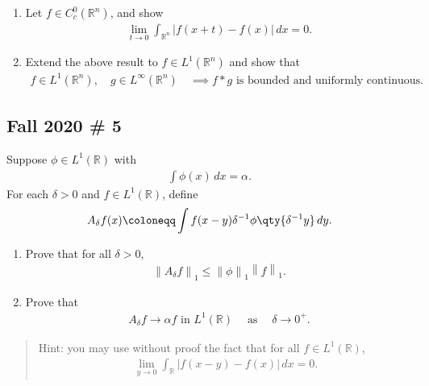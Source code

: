 \begin{enumerate}
\def\labelenumi{\arabic{enumi}.}
\item
  Let \(f \in C_c^0({\mathbb{R}}^n)\), and show
  \begin{align*}
  \lim _{t \to 0} \int_{{\mathbb{R}}^n} |f(x+t) - f(x)| \, dx = 0
  .\end{align*}
\item
  Extend the above result to \(f\in L^1({\mathbb{R}}^n)\) and show that
  \begin{align*}
  f\in L^1({\mathbb{R}}^n), \quad g\in L^\infty({\mathbb{R}}^n) \quad
  \implies f \ast g \text{ is bounded and uniformly continuous. }
  \end{align*}
\end{enumerate}

\hypertarget{fall-2020-5}{%
\subsection{Fall 2020 \# 5}\label{fall-2020-5}}

Suppose \(\phi\in L^1({\mathbb{R}})\) with
\begin{align*}  
\int \phi(x) \, dx = \alpha
.\end{align*}
For each \(\delta > 0\) and \(f\in L^1({\mathbb{R}})\), define
\begin{align*}  
A_\delta f(x) \coloneqq\int f(x-y) \delta^{-1} \phi\qty{\delta^{-1} y}\, dy
.\end{align*}

\begin{enumerate}
\def\labelenumi{\alph{enumi}.}
\item
  Prove that for all \(\delta > 0\),
  \begin{align*}  
  {\left\lVert {A_\delta f} \right\rVert}_1 \leq {\left\lVert {\phi} \right\rVert}_1 {\left\lVert {f} \right\rVert}_1
  .\end{align*}
\item
  Prove that
  \begin{align*}  
  A_\delta f \to \alpha f \text{ in } L^1({\mathbb{R}}) {\quad \operatorname{as} \quad} \delta\to 0^+
  .\end{align*}
\end{enumerate}

\begin{quote}
Hint: you may use without proof the fact that for all
\(f\in L^1({\mathbb{R}})\),
\begin{align*}  
\lim_{y\to 0} \int_{\mathbb{R}}{\left\lvert {f(x-y) - f(x)} \right\rvert}\, dx = 0
.\end{align*}
\end{quote}

